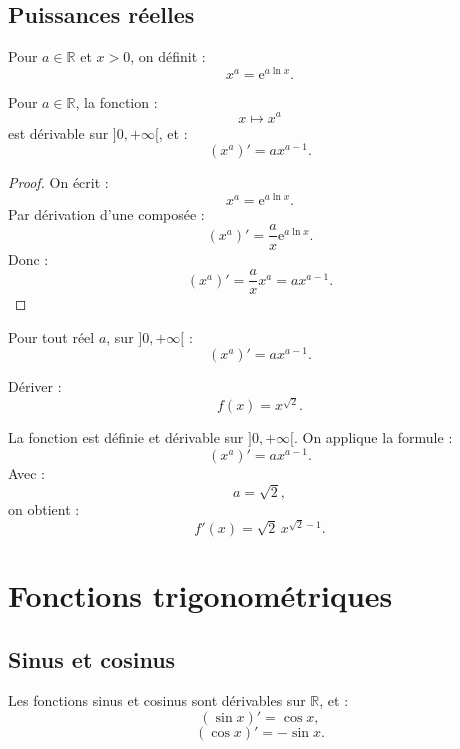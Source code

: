 \documentclass[11pt,a4paper]{article}
\newcommand{\R}{\mathbb R}
\newcommand{\e}{\mathrm e}
\begin{document}
\subsection{Puissances réelles}

\begin{definitionbox}
Pour \(a\in\R\) et \(x>0\), on définit :
\[
x^a=\e^{a\ln x}.
\]
\end{definitionbox}

\begin{theorembox}
Pour \(a\in\R\), la fonction :
\[
x\mapsto x^a
\]
est dérivable sur \(]0,+\infty[\), et :
\[
(x^a)'=a x^{a-1}.
\]
\end{theorembox}

\begin{proof}
On écrit :
\[
x^a=\e^{a\ln x}.
\]
Par dérivation d'une composée :
\[
(x^a)'=\frac{a}{x}\e^{a\ln x}.
\]
Donc :
\[
(x^a)'=\frac{a}{x}x^a=ax^{a-1}.
\]
\end{proof}

\begin{retenirbox}
Pour tout réel \(a\), sur \(]0,+\infty[\) :
\[
(x^a)'=ax^{a-1}.
\]
\end{retenirbox}

\begin{exercicebox}[Puissances]
Dériver :
\[
f(x)=x^{\sqrt2}.
\]
\end{exercicebox}

\begin{correctionbox}
La fonction est définie et dérivable sur \(]0,+\infty[\).  
On applique la formule :
\[
(x^a)'=ax^{a-1}.
\]
Avec :
\[
a=\sqrt2,
\]
on obtient :
\[
f'(x)=\sqrt2\,x^{\sqrt2-1}.
\]
\end{correctionbox}

\section{Fonctions trigonométriques}

\subsection{Sinus et cosinus}

\begin{theorembox}
Les fonctions sinus et cosinus sont dérivables sur \(\R\), et :
\[
(\sin x)'=\cos x,
\]
\[
(\cos x)'=-\sin x.
\]
\end{theorembox}
\end{document}
